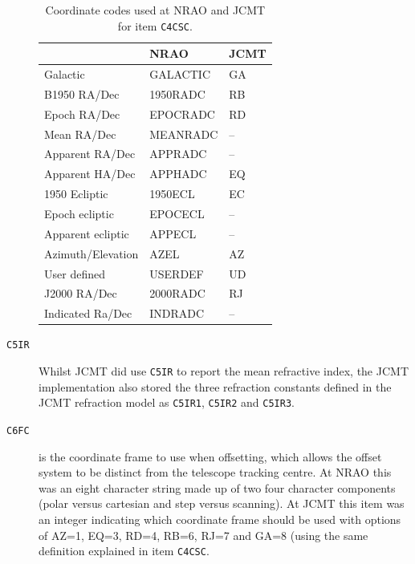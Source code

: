 \documentclass[final,authoryear,5p,times,twocolumn]{elsarticle}
\begin{document}
\begin{description}
\begin{table}
\caption{Coordinate codes used at NRAO and JCMT for item
  \texttt{C4CSC}.}
\label{tab:coordcodes}
\begin{center}
\begin{tabular}{lll}
\hline
 & NRAO & JCMT \\ \hline
Galactic & GALACTIC & GA \\
B1950 RA/Dec & 1950RADC & RB \\
Epoch RA/Dec & EPOCRADC & RD \\
Mean RA/Dec & MEANRADC & -- \\
Apparent RA/Dec & APPRADC & -- \\
Apparent HA/Dec & APPHADC & EQ \\
1950 Ecliptic & 1950ECL & EC \\
Epoch ecliptic & EPOCECL & -- \\
Apparent ecliptic & APPECL & -- \\
Azimuth/Elevation & AZEL & AZ \\
User defined & USERDEF & UD \\
J2000 RA/Dec & 2000RADC & RJ \\
Indicated Ra/Dec & INDRADC & -- \\
\hline
\end{tabular}
\end{center}
\end{table}

\item[\texttt{C5IR}] Whilst JCMT did use \texttt{C5IR} to report the
  mean refractive index, the JCMT implementation also stored the three
  refraction constants defined in the JCMT refraction model
  \citep{mtin26} as \texttt{C5IR1}, \texttt{C5IR2} and \texttt{C5IR3}.

\item[\texttt{C6FC}] is the coordinate frame to use when offsetting,
  which allows the offset system to be distinct from the telescope
  tracking centre. At NRAO this was an eight character string made up
  of two four character components (polar versus cartesian and step
  versus scanning). At JCMT this item was an integer indicating which
  coordinate frame should be used with options of AZ=1, EQ=3, RD=4,
  RB=6, RJ=7 and GA=8 (using the same definition explained in item
  \texttt{C4CSC}.


\end{description}
\end{document}
